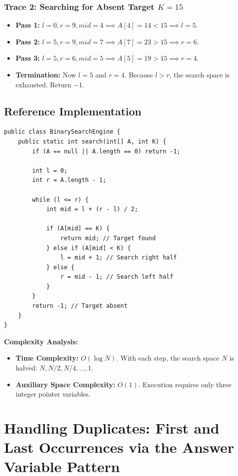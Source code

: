 \documentclass[10pt,journal,compsoc,onecolumn]{IEEEtran}
\begin{document}
\subsubsection{Trace 2: Searching for Absent Target $K = 15$}
\begin{itemize}
    \item \textbf{Pass 1:} $l = 0, r = 9, mid = 4 \implies A[4] = 14 < 15 \implies l = 5$.
    \item \textbf{Pass 2:} $l = 5, r = 9, mid = 7 \implies A[7] = 23 > 15 \implies r = 6$.
    \item \textbf{Pass 3:} $l = 5, r = 6, mid = 5 \implies A[5] = 19 > 15 \implies r = 4$.
    \item \textbf{Termination:} Now $l = 5$ and $r = 4$. Because $l > r$, the search space is exhausted. Return $-1$.
\end{itemize}

\subsection{Reference Implementation}

\begin{verbatim}
public class BinarySearchEngine {
    public static int search(int[] A, int K) {
        if (A == null || A.length == 0) return -1;

        int l = 0;
        int r = A.length - 1;

        while (l <= r) {
            int mid = l + (r - l) / 2;

            if (A[mid] == K) {
                return mid; // Target found
            } else if (A[mid] < K) {
                l = mid + 1; // Search right half
            } else {
                r = mid - 1; // Search left half
            }
        }
        return -1; // Target absent
    }
}
\end{verbatim}

\textbf{Complexity Analysis:}
\begin{itemize}
    \item \textbf{Time Complexity:} $O(\log N)$. With each step, the search space $N$ is halved: $N, N/2, N/4, \dots, 1$.
    \item \textbf{Auxiliary Space Complexity:} $O(1)$. Execution requires only three integer pointer variables.
\end{itemize}

\section{Handling Duplicates: First and Last Occurrences via the Answer Variable Pattern}
\label{sec:duplicates}
\end{document}
